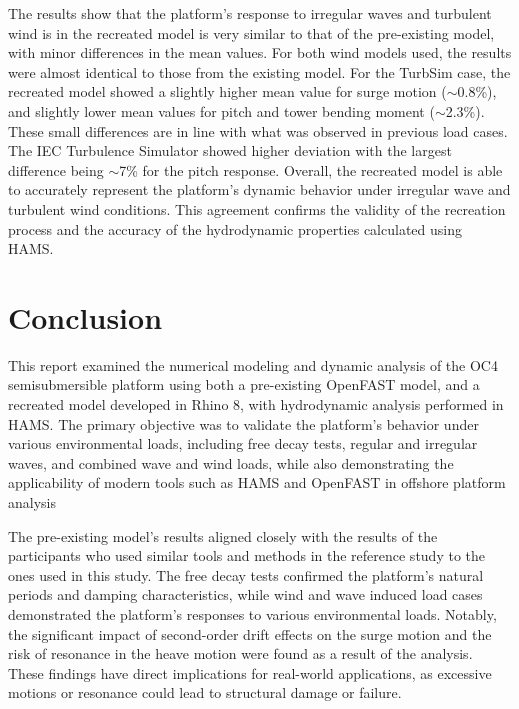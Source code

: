 \documentclass[a4paper, 11pt]{article}
\begin{document}
The results show that the platform's response to irregular waves and turbulent wind is in the recreated model is very similar to that of the pre-existing model, with minor differences in the mean values. For both wind models used, the results were almost identical to those from the existing model. For the TurbSim case, the recreated model showed a slightly higher mean value for surge motion ($\sim$0.8\%), and slightly lower mean values for pitch and tower bending moment ($\sim$2.3\%). These small differences are in line with what was observed in previous load cases. The IEC Turbulence Simulator showed higher deviation with the largest difference being $\sim$7\% for the pitch response. Overall, the recreated model is able to accurately represent the platform's dynamic behavior under irregular wave and turbulent wind conditions. This agreement confirms the validity of the recreation process and the accuracy of the hydrodynamic properties calculated using HAMS.

\section{Conclusion}

\hspace*{0.5cm}This report examined the numerical modeling and dynamic analysis of the OC4 semisubmersible platform using both a pre-existing OpenFAST model, and a recreated model developed in Rhino 8, with hydrodynamic analysis performed in HAMS. The primary objective was to validate the platform's behavior under various environmental loads, including free decay tests, regular and irregular waves, and combined wave and wind loads, while also demonstrating the applicability of modern tools such as HAMS and OpenFAST in offshore platform analysis

The pre-existing model's results aligned closely with the results of the participants who used similar tools and methods in the reference study \cite{Robertson2014} to the ones used in this study. The free decay tests confirmed the platform's natural periods and damping characteristics, while wind and wave induced load cases demonstrated the platform's responses to various environmental loads. Notably, the significant impact of second-order drift effects on the surge motion and the risk of resonance in the heave motion were found as a result of the analysis. These findings have direct implications for real-world applications, as excessive motions or resonance could lead to structural damage or failure.
\end{document}
